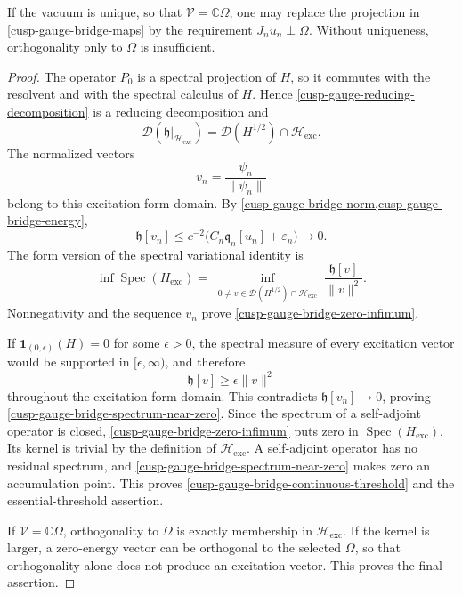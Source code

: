 \begin{proposition}
If the vacuum is unique, so that \(\mathcal V=\mathbb C\Omega\), one may
replace the projection in \cref{cusp-gauge-bridge-maps} by the requirement
\(J_nu_n\perp\Omega\).  Without uniqueness, orthogonality only to
\(\Omega\) is insufficient.
\end{proposition}

\begin{proof}
The operator \(P_0\) is a spectral projection of \(H\), so it commutes
with the resolvent and with the spectral calculus of \(H\).  Hence
\cref{cusp-gauge-reducing-decomposition} is a reducing decomposition and
\[
 \mathcal D(\mathfrak h|_{\mathcal H_{\mathrm{exc}}})
 =\mathcal D(H^{1/2})\cap\mathcal H_{\mathrm{exc}}.
\]
The normalized vectors
\[
 v_n=\frac{\psi_n}{\lVert\psi_n\rVert}
\]
belong to this excitation form domain.  By
\cref{cusp-gauge-bridge-norm,cusp-gauge-bridge-energy},
\[
 \mathfrak h[v_n]
 \le c^{-2}
 \bigl(C_n\mathfrak q_n[u_n]+\varepsilon_n\bigr)
 \longrightarrow0.
\]
The form version of the spectral variational identity is
\[
 \inf\operatorname{Spec}(H_{\mathrm{exc}})
 =\inf_{\substack{
 0\ne v\in\mathcal D(H^{1/2})\cap\mathcal H_{\mathrm{exc}}
 }}
 \frac{\mathfrak h[v]}{\lVert v\rVert^2}.
\]
Nonnegativity and the sequence \(v_n\) prove
\cref{cusp-gauge-bridge-zero-infimum}.

If \(\mathbf 1_{(0,\epsilon)}(H)=0\) for some \(\epsilon>0\), the spectral
measure of every excitation vector would be supported in
\([\epsilon,\infty)\), and therefore
\[
 \mathfrak h[v]\ge\epsilon\lVert v\rVert^2
\]
throughout the excitation form domain.  This contradicts
\(\mathfrak h[v_n]\to0\), proving
\cref{cusp-gauge-bridge-spectrum-near-zero}.  Since the spectrum of a
self-adjoint operator is closed,
\cref{cusp-gauge-bridge-zero-infimum} puts zero in
\(\operatorname{Spec}(H_{\mathrm{exc}})\).  Its kernel is trivial by the
definition of \(\mathcal H_{\mathrm{exc}}\).  A self-adjoint operator has
no residual spectrum, and
\cref{cusp-gauge-bridge-spectrum-near-zero} makes zero an accumulation
point.  This proves
\cref{cusp-gauge-bridge-continuous-threshold} and the essential-threshold
assertion.

If \(\mathcal V=\mathbb C\Omega\), orthogonality to \(\Omega\) is exactly
membership in \(\mathcal H_{\mathrm{exc}}\).  If the kernel is larger, a
zero-energy vector can be orthogonal to the selected \(\Omega\), so that
orthogonality alone does not produce an excitation vector.  This proves
the final assertion.
\end{proof}

